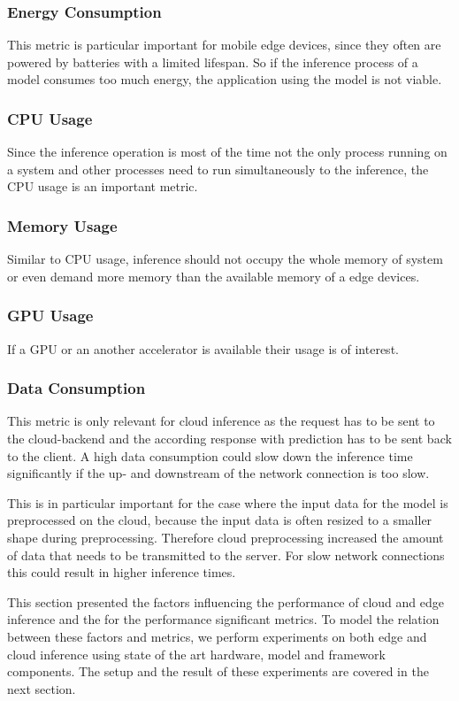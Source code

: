 \subsubsection{Energy Consumption}
This metric is particular important for mobile edge devices, since they often are powered by batteries with a limited lifespan. So if the inference process of a model consumes too much energy, the application using the model is not viable.
\subsubsection{CPU Usage}
Since the inference operation is most of the time not the only process running on a system and other processes need to run simultaneously to the inference, the CPU usage is an important metric.
\subsubsection{Memory Usage}
Similar to CPU usage, inference should not occupy the whole memory of system or even demand more memory than the available memory of a edge devices.
\subsubsection{GPU Usage}
If a GPU or an another accelerator is available their usage is of interest.

\subsubsection{Data Consumption}
This metric is only relevant for cloud inference as the request has to be sent to the cloud-backend and the according response with prediction has to be sent back to the client. A high data consumption could slow down the inference time significantly if the up- and downstream of the network connection is too slow. 

This is in particular important for the case where the input data for the model is preprocessed on the cloud, because the input data is often resized to a smaller shape during preprocessing. Therefore cloud preprocessing increased the amount of data that needs to be transmitted to the server. For slow network connections this could result in higher inference times.




This section presented the factors influencing the performance of cloud and edge inference and the for the performance significant metrics.
To model the relation between these factors and metrics, we perform experiments on both edge and cloud inference using state of the art hardware, model and framework components. The setup and the result of these experiments are covered in the next section.
\endinput 